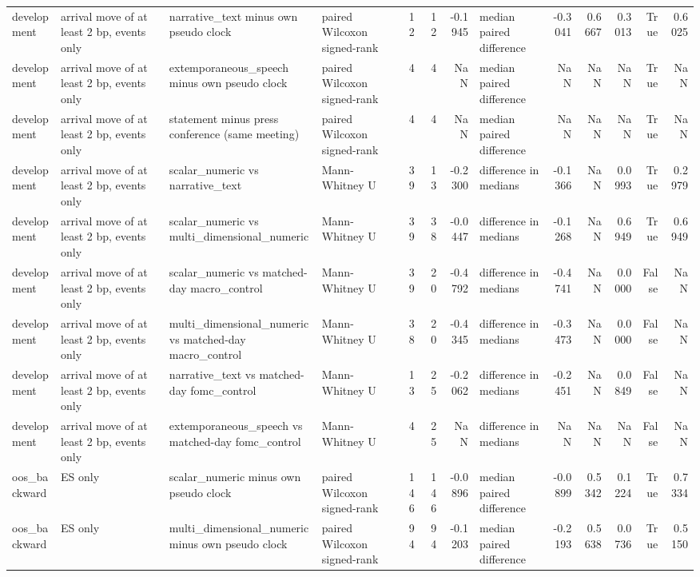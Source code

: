 \begin{tabular}{llllrrrlrrrrr}
development & arrival move of at least 2 bp, events only & narrative_text minus own pseudo clock & paired Wilcoxon signed-rank & 12 & 12 & -0.1945 & median paired difference & -0.3041 & 0.6667 & 0.3013 & True & 0.6025 \\
development & arrival move of at least 2 bp, events only & extemporaneous_speech minus own pseudo clock & paired Wilcoxon signed-rank & 4 & 4 & NaN & median paired difference & NaN & NaN & NaN & True & NaN \\
development & arrival move of at least 2 bp, events only & statement minus press conference (same meeting) & paired Wilcoxon signed-rank & 4 & 4 & NaN & median paired difference & NaN & NaN & NaN & True & NaN \\
development & arrival move of at least 2 bp, events only & scalar_numeric vs narrative_text & Mann-Whitney U & 39 & 13 & -0.2300 & difference in medians & -0.1366 & NaN & 0.0993 & True & 0.2979 \\
development & arrival move of at least 2 bp, events only & scalar_numeric vs multi_dimensional_numeric & Mann-Whitney U & 39 & 38 & -0.0447 & difference in medians & -0.1268 & NaN & 0.6949 & True & 0.6949 \\
development & arrival move of at least 2 bp, events only & scalar_numeric vs matched-day macro_control & Mann-Whitney U & 39 & 20 & -0.4792 & difference in medians & -0.4741 & NaN & 0.0000 & False & NaN \\
development & arrival move of at least 2 bp, events only & multi_dimensional_numeric vs matched-day macro_control & Mann-Whitney U & 38 & 20 & -0.4345 & difference in medians & -0.3473 & NaN & 0.0000 & False & NaN \\
development & arrival move of at least 2 bp, events only & narrative_text vs matched-day fomc_control & Mann-Whitney U & 13 & 25 & -0.2062 & difference in medians & -0.2451 & NaN & 0.0849 & False & NaN \\
development & arrival move of at least 2 bp, events only & extemporaneous_speech vs matched-day fomc_control & Mann-Whitney U & 4 & 25 & NaN & difference in medians & NaN & NaN & NaN & False & NaN \\
oos_backward & ES only & scalar_numeric minus own pseudo clock & paired Wilcoxon signed-rank & 146 & 146 & -0.0896 & median paired difference & -0.0899 & 0.5342 & 0.1224 & True & 0.7334 \\
oos_backward & ES only & multi_dimensional_numeric minus own pseudo clock & paired Wilcoxon signed-rank & 94 & 94 & -0.1203 & median paired difference & -0.2193 & 0.5638 & 0.0736 & True & 0.5150 \\

\end{tabular}
